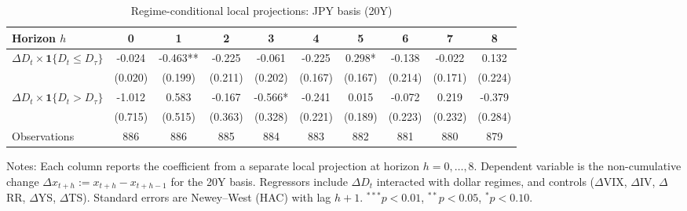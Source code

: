 \begin{table}[!htbp]\centering
\caption{Regime-conditional local projections: JPY basis (20Y)}
\label{tab:lp_jpy_20y}
\begin{tabular}{lccccccccc}
\toprule
Horizon $h$ & 0 & 1 & 2 & 3 & 4 & 5 & 6 & 7 & 8 \\
\midrule
$\Delta D_t \times \mathbf{1}\{D_t \le D_\tau\}$ & -0.024 & -0.463** & -0.225 & -0.061 & -0.225 & 0.298* & -0.138 & -0.022 & 0.132 \\
  & (0.020) & (0.199) & (0.211) & (0.202) & (0.167) & (0.167) & (0.214) & (0.171) & (0.224) \\
$\Delta D_t \times \mathbf{1}\{D_t > D_\tau\}$ & -1.012 & 0.583 & -0.167 & -0.566* & -0.241 & 0.015 & -0.072 & 0.219 & -0.379 \\
  & (0.715) & (0.515) & (0.363) & (0.328) & (0.221) & (0.189) & (0.223) & (0.232) & (0.284) \\
\midrule
Observations & 886 & 886 & 885 & 884 & 883 & 882 & 881 & 880 & 879 \\
\bottomrule
\end{tabular}
\begin{flushleft}\footnotesize Notes: Each column reports the coefficient from a separate local projection at horizon $h=0,\dots,8$. Dependent variable is the non-cumulative change $\Delta x_{t+h}:=x_{t+h}-x_{t+h-1}$ for the 20Y basis. Regressors include $\Delta D_t$ interacted with dollar regimes, and controls ($\Delta$VIX, $\Delta$IV, $\Delta$RR, $\Delta$YS, $\Delta$TS). Standard errors are Newey--West (HAC) with lag $h+1$. $^{***}p<0.01$, $^{**}p<0.05$, $^{*}p<0.10$.\end{flushleft}
\end{table}